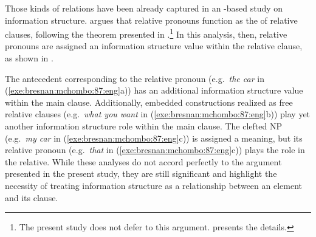 Those kinds of relations have been already captured in an
-based study on information structure. \citet{bresnan:mchombo:87} argues that
relative pronouns function as the  of relative clauses, following
the theorem presented in \citet{kuno:76}.\footnote{The present study
  does not defer to this argument.  presents the
  details.}  In this analysis, then, relative pronouns are assigned an
information structure value within the relative clause, as shown in
.




\noindent The antecedent corresponding to the relative pronoun
(e.g.\ \textit{the car} in (\ref{exe:bresnan:mchombo:87:eng}a)) has an
additional information structure value within the main
clause. Additionally,
embedded constructions realized as free relative clauses
(e.g.\ \textit{what you want} in (\ref{exe:bresnan:mchombo:87:eng}b))
play yet another information structure role within the main
clause. The clefted NP (e.g.\ \textit{my car} in
(\ref{exe:bresnan:mchombo:87:eng}c)) is assigned a 
meaning, but its relative pronoun (e.g.\ \textit{that} in
(\ref{exe:bresnan:mchombo:87:eng}c)) plays the  role in the
relative.  While these analyses do not accord perfectly to the
argument presented in the present study, they are still significant
and highlight the necessity of treating information structure as a
relationship between an element and its clause.



